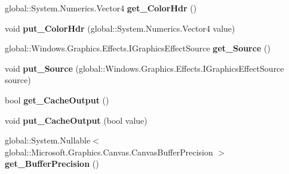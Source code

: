 \begin{DoxyCompactItemize}
global\+::\+System.\+Numerics.\+Vector4 {\bfseries get\+\_\+\+Color\+Hdr} ()
\item 
\mbox{\label{class_microsoft_1_1_graphics_1_1_canvas_1_1_effects_1_1_vignette_effect_aade688f3cc59d93bb8055c4041a67784}} 
void {\bfseries put\+\_\+\+Color\+Hdr} (global\+::\+System.\+Numerics.\+Vector4 value)
\item 
\mbox{\label{class_microsoft_1_1_graphics_1_1_canvas_1_1_effects_1_1_vignette_effect_a32e1b74fdd013067a372cf3cf5ac1d77}} 
global\+::\+Windows.\+Graphics.\+Effects.\+I\+Graphics\+Effect\+Source {\bfseries get\+\_\+\+Source} ()
\item 
\mbox{\label{class_microsoft_1_1_graphics_1_1_canvas_1_1_effects_1_1_vignette_effect_a790cec4778696909d732950890de8395}} 
void {\bfseries put\+\_\+\+Source} (global\+::\+Windows.\+Graphics.\+Effects.\+I\+Graphics\+Effect\+Source source)
\item 
\mbox{\label{class_microsoft_1_1_graphics_1_1_canvas_1_1_effects_1_1_vignette_effect_a280b2b24300647819979ccbcf4e5a342}} 
bool {\bfseries get\+\_\+\+Cache\+Output} ()
\item 
\mbox{\label{class_microsoft_1_1_graphics_1_1_canvas_1_1_effects_1_1_vignette_effect_a034b1c0d3009f5e0244c6d24b0c59785}} 
void {\bfseries put\+\_\+\+Cache\+Output} (bool value)
\item 
\mbox{\label{class_microsoft_1_1_graphics_1_1_canvas_1_1_effects_1_1_vignette_effect_add4fc5bc40b5de7c79c66ec5519927f0}} 
global\+::\+System.\+Nullable$<$ global\+::\+Microsoft.\+Graphics.\+Canvas.\+Canvas\+Buffer\+Precision $>$ {\bfseries get\+\_\+\+Buffer\+Precision} ()
\item 
\mbox{\label{class_microsoft_1_1_graphics_1_1_canvas_1_1_effects_1_1_vignette_effect_ace448a4e7268b3ba475c01f07231734e}} 

\end{DoxyCompactItemize}
